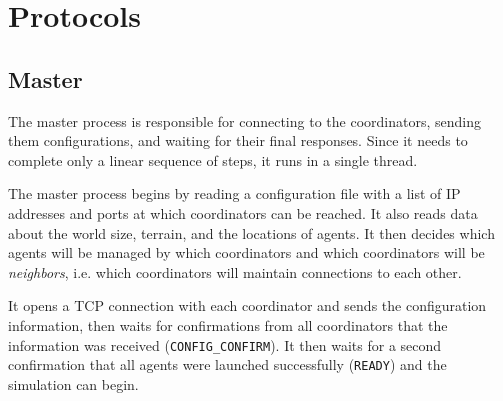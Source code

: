 \section{Protocols}

\subsection{Master}

The master process is responsible for connecting to the coordinators, sending them configurations, and waiting for their final responses. Since it needs to complete only a linear sequence of steps, it runs in a single thread.

The master process begins by reading a configuration file with a list of IP addresses and ports at which coordinators can be reached. It also reads data about the world size, terrain, and the locations of agents. It then decides which agents will be managed by which coordinators and which coordinators will be \emph{neighbors}, i.e. which coordinators will maintain connections to each other.

It opens a TCP connection with each coordinator and sends the configuration information, then waits for confirmations from all coordinators that the information was received (\texttt{CONFIG\_CONFIRM}). It then waits for a second confirmation that all agents were launched successfully (\texttt{READY}) and the simulation can begin.

